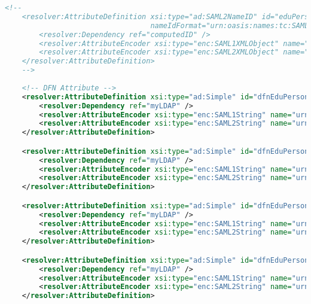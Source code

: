 \begin{lstlisting}[language=xml]
    <!--
    <resolver:AttributeDefinition xsi:type="ad:SAML2NameID" id="eduPersonTargetedID" 
                                  nameIdFormat="urn:oasis:names:tc:SAML:2.0:nameid-format:persistent" sourceAttributeID="computedID">
        <resolver:Dependency ref="computedID" />
        <resolver:AttributeEncoder xsi:type="enc:SAML1XMLObject" name="urn:oid:1.3.6.1.4.1.5923.1.1.1.10" />
        <resolver:AttributeEncoder xsi:type="enc:SAML2XMLObject" name="urn:oid:1.3.6.1.4.1.5923.1.1.1.10" friendlyName="eduPersonTargetedID" />
    </resolver:AttributeDefinition>
    -->
    
    <!-- DFN Attribute -->
    <resolver:AttributeDefinition xsi:type="ad:Simple" id="dfnEduPersonCostCenter" sourceAttributeID="dfnEduPersonCostCenter">
        <resolver:Dependency ref="myLDAP" />
        <resolver:AttributeEncoder xsi:type="enc:SAML1String" name="urn:mace:dir:attribute-def:dfnEduPersonCostCenter" />
        <resolver:AttributeEncoder xsi:type="enc:SAML2String" name="urn:oid:1.3.6.1.4.1.22177.400.1.1.3.1" friendlyName="dfnEduPersonCostCenter" />
    </resolver:AttributeDefinition>

    <resolver:AttributeDefinition xsi:type="ad:Simple" id="dfnEduPersonStudyBranch1" sourceAttributeID="dfnEduPersonStudyBranch1">
        <resolver:Dependency ref="myLDAP" />
        <resolver:AttributeEncoder xsi:type="enc:SAML1String" name="urn:mace:dir:attribute-def:dfnEduPersonStudyBranch1" />
        <resolver:AttributeEncoder xsi:type="enc:SAML2String" name="urn:oid:1.3.6.1.4.1.22177.400.1.1.3.2" friendlyName="dfnEduPersonStudyBranch1" />
    </resolver:AttributeDefinition>

    <resolver:AttributeDefinition xsi:type="ad:Simple" id="dfnEduPersonStudyBranch2" sourceAttributeID="dfnEduPersonStudyBranch2">
        <resolver:Dependency ref="myLDAP" />
        <resolver:AttributeEncoder xsi:type="enc:SAML1String" name="urn:mace:dir:attribute-def:dfnEduPersonStudyBranch2" />
        <resolver:AttributeEncoder xsi:type="enc:SAML2String" name="urn:oid:1.3.6.1.4.1.22177.400.1.1.3.3" friendlyName="dfnEduPersonStudyBranch2" />
    </resolver:AttributeDefinition>

    <resolver:AttributeDefinition xsi:type="ad:Simple" id="dfnEduPersonStudyBranch3" sourceAttributeID="dfnEduPersonStudyBranch3">
        <resolver:Dependency ref="myLDAP" />
        <resolver:AttributeEncoder xsi:type="enc:SAML1String" name="urn:mace:dir:attribute-def:dfnEduPersonStudyBranch2" />
        <resolver:AttributeEncoder xsi:type="enc:SAML2String" name="urn:oid:1.3.6.1.4.1.22177.400.1.1.3.4" friendlyName="dfnEduPersonStudyBranch3" />
    </resolver:AttributeDefinition>


\end{lstlisting}
